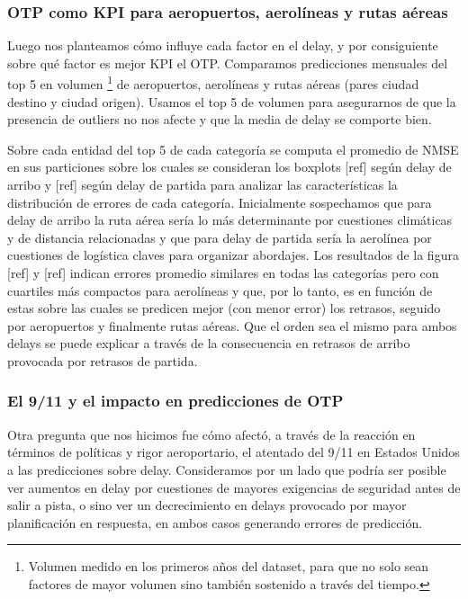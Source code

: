 \subsubsection{OTP como KPI para aeropuertos, aerolíneas y rutas aéreas}
Luego nos planteamos cómo influye cada factor en el delay, y por consiguiente sobre qué factor es mejor KPI el OTP. Comparamos predicciones mensuales del top 5 en volumen \footnote{Volumen medido en los primeros años del dataset, para que no solo sean factores de mayor volumen sino también sostenido a través del tiempo.} de aeropuertos, aerolíneas y rutas aéreas (pares ciudad destino y ciudad origen). Usamos el top 5 de volumen para asegurarnos de que la presencia de outliers no nos afecte y que la media de delay se comporte bien.

Sobre cada entidad del top 5 de cada categoría se computa el promedio de NMSE en sus particiones sobre los cuales se consideran los boxplots [ref] según delay de arribo y [ref] según delay de partida para analizar las características la distribución de errores de cada categoría. Inicialmente sospechamos que para delay de arribo la ruta aérea sería lo más determinante por cuestiones climáticas y de distancia relacionadas y que para delay de partida sería la aerolínea por cuestiones de logística claves para organizar abordajes. Los resultados de la figura [ref] y [ref] indican errores promedio similares en todas las categorías pero con cuartiles más compactos para aerolíneas y que, por lo tanto, es en función de estas sobre las cuales se predicen mejor (con menor error) los retrasos, seguido por aeropuertos y finalmente rutas aéreas. Que el orden sea el mismo para ambos delays se puede explicar a través de la consecuencia en retrasos de arribo provocada por retrasos de partida.

\subsubsection{El 9/11 y el impacto en predicciones de OTP}
Otra pregunta que nos hicimos fue cómo afectó, a través de la reacción en términos de políticas y rigor aeroportario, el atentado del 9/11 en Estados Unidos a las predicciones sobre delay. Consideramos por un lado que podría ser posible ver aumentos en delay por cuestiones de mayores exigencias de seguridad antes de salir a pista, o sino ver un decrecimiento en delays provocado por mayor planificación en respuesta, en ambos casos generando errores de predicción.

